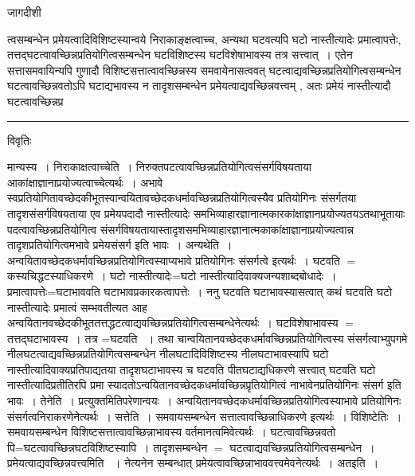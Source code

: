 \documentclass[10pt, openany]{book}
\begin{document}
{
\newpage
\lfoot{}
\begin{center} जागदीशी \end{center}
{\la त्वसम्बन्धेन प्रमेयत्वादिविशिष्टस्यान्वये निराकाङ्क्षत्वाच्च, अन्यथा
घटवत्यपि घटो नास्तीत्यादेः प्रमात्वापत्तेः,
तत्तद्घटत्वावच्छिन्नप्रतियोगित्वसम्बन्धेन घटविशिष्टस्य घटविशेषाभावस्य तत्र सत्त्वात्~। एतेन सत्तासमवायिन्यपि गुणादौ विशिष्टसत्तात्वावच्छिन्नस्य समवायेनासत्ववत्
घटत्वाद्यवच्छिन्नप्रतियोगित्वसम्बन्धेन घटत्वावच्छिन्नवतोऽपि घटाद्यभावस्य न तादृशसम्बन्धेन प्रमेयत्वाद्यवच्छिन्नवत्त्वम् , अतः प्रमेयं नास्तीत्यादौ
घटत्वावच्छिन्नप्र}\\
\hrule
\begin{center}     विवृतिः \end{center}
मान्यस्य~। निराकाक्षत्वाच्चेति~। निरुक्तपटत्वावच्छिन्नप्रतियोगित्वसंसर्गविषयताया आकांक्षाज्ञानाप्रयोज्यत्वाच्चेत्यर्थः~। अभावे
स्वप्रतियोगितावच्छेदकीभूतस्वान्वयितावच्छेदकधर्मावच्छिन्नप्रतियोगित्वस्यैव प्रतियोगिनः संसर्गतया तादृशसंसर्गविषयताया एव प्रमेयपदादौ नास्तीत्यादेः
समभिव्याहारज्ञानात्मकारकांक्षाज्ञानप्रयोज्यतयऽतथाभूतायाः
पदत्वावच्छिन्नप्रतियोगित्व संसर्गविषयतायास्तादृशसमभिव्याहारज्ञानात्मकाकांक्षाज्ञानाप्रयोज्यत्वान्न तादृशप्रतियोगित्वमभावे प्रमेयसंसर्ग इति भावः~। अन्यथेति~। अन्वयितावच्छेदकधर्मावच्छिन्नप्रतियोगित्वस्याप्यभावे प्रतियोगिनः संसर्गत्वे इत्यर्थः~। घटवति  $=$ कस्यचिद्धटस्याधिकरणे~।
घटो नास्तीत्यादेः=घटो नास्तीत्यादिवाक्यजन्यशाब्दबोधादेः~।
प्रमात्वापत्तेः=घटाभाववति घटाभावप्रकारकत्वापत्तेः~। ननु घटवति घटाभावस्यासत्वात् कथं घटवति घटो नास्तीत्यादेः प्रमात्वं सम्भवतीत्यत आह अन्वयितानवच्छेदकीभूततत्तद्धटत्वाद्यवच्छिन्नप्रतियोगित्वसम्बन्धेनेत्यर्थः~।
घटविशेषाभावस्य $=$ 
तत्तद्घटाभावस्य~। तत्र =घटवति ~। तथा
चान्वयितानवच्छेदकधर्मावच्छिन्नप्रतियोगित्वस्य संसर्गत्वाभ्युपगमे नीलघटत्वाद्यवच्छिन्नप्रतियोगित्वसम्बन्धेन
नीलघटादिविशिष्टस्य नीलघटाभावस्यापि घटो नास्तीत्यादिवाक्यप्रतिपाद्यतया
तादृशघटाभावस्य च घटवति पीतघटाद्यधिकरणे सत्त्वात् घटवति घटो नास्तीत्यादिप्रतीतिरपि प्रमा स्यादतोऽन्वयितानवच्छेदकधर्मावच्छिन्नप्रृतियोगित्वं
नाभावेनप्रतियोगिनः
संसर्ग इति भावः~। {\la तेनेति~।} प्रत्युक्तमितिपरेणान्वयः~।
अन्वयितानवच्छेदकधर्मावच्छिन्नप्रतियोगित्वस्याभावे प्रतियोगिनः संसर्गत्वनिराकरणेनेत्यर्थः~। सत्तेति~। समवायसम्बन्धेन सत्तात्वावच्छिन्नाधिकरणे इत्यर्थः~। {\qt विशिष्टेतिः~}। समवायसम्बन्धेन विशिष्टसत्तात्वावच्छिन्नाभावस्य  वर्तमानत्वमिवेत्यर्थः~। घटत्वावच्छिन्नवतो पि=घटत्वावच्छिन्नघटविशिष्टस्यापि~।
तादृशसम्बन्धेन $=$ घटत्वाद्यवच्छिन्नप्रतियोगित्वसम्बन्धेन~। {\qt प्रमेयत्वाद्यवच्छिन्नवत्त्वमिति}
~।
नेत्यनेन सम्बन्धात् प्रमेयत्वावच्छिन्नाभाववत्त्वमेवनेत्यर्थः~। अतइति~।
}
\end{document}
